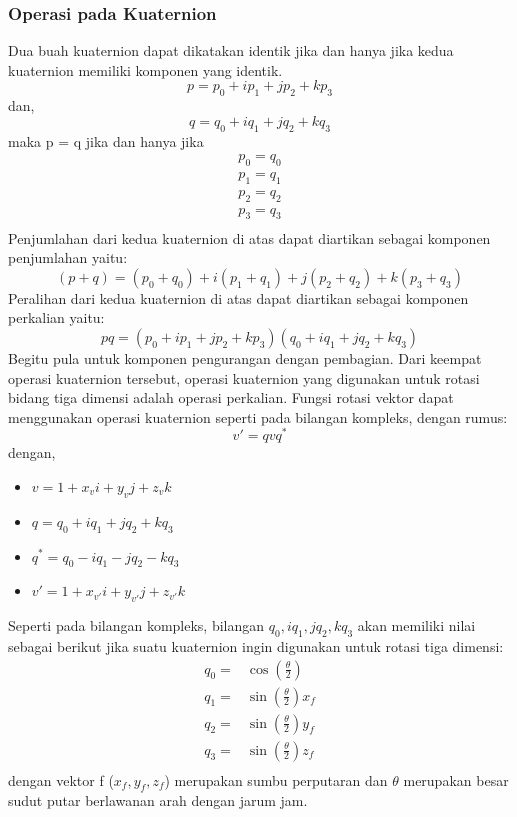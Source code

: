 \subsubsection{Operasi pada Kuaternion}
\label{sssec:operasi_pada_kuaternion}
Dua buah kuaternion dapat dikatakan identik jika dan hanya jika kedua kuaternion memiliki komponen yang identik.
\[
	p = p_0 +ip_1+jp_2+kp_3
\]
dan,
\[
	q = q_0 + i q_1 + j q_2 + k q_3
\]
maka p = q jika dan hanya jika
\begin{equation}
	\begin{split}
	p_0=q_0\\
	p_1=q_1\\
	p_2=q_2\\
	p_3=q_3\\
	\end{split}
\end{equation}
Penjumlahan dari kedua kuaternion di atas dapat diartikan sebagai komponen penjumlahan yaitu:
\[
	(p+q)=(p_0+q_0)+i(p_1+q_1)+j(p_2+q_2)+k(p_3+q_3)
\]
Peralihan dari kedua kuaternion di atas dapat diartikan sebagai komponen perkalian yaitu:
\[
	pq = (p_0 +ip_1+jp_2+kp_3)(q_0 + i q_1 + j q_2 + k q_3)
\]
Begitu pula untuk komponen pengurangan dengan pembagian. 
Dari keempat operasi kuaternion tersebut, operasi kuaternion yang digunakan untuk rotasi bidang tiga dimensi adalah operasi perkalian. Fungsi rotasi vektor dapat menggunakan operasi kuaternion seperti pada bilangan kompleks, dengan rumus:
\[
	v' = qvq^*
\]
dengan,
\begin{itemize}
	\item \(v = 1 + x_v i +y_v j + z_v k\)
	\item \(q = q_0 + i q_1 + j q_2 + k q_3	\)
	\item \(q^* =  q_0 - i q_1 - j q_2 - k q_3\)
	\item \(v' = 1 + x_{v'} i +y_{v'} j + z_{v'} k\)
\end{itemize}
Seperti pada bilangan kompleks, bilangan $q_0 ,i q_1,j q_2,k q_3$ akan memiliki nilai sebagai berikut jika suatu kuaternion ingin digunakan untuk rotasi tiga dimensi:
\begin{equation}
	\begin{split}
	q_0=& \cos (\frac{\theta}{2})\\
	q_1=& \sin (\frac{\theta}{2}) x_f\\
	q_2=& \sin (\frac{\theta}{2}) y_f\\
	q_3=& \sin (\frac{\theta}{2}) z_f\\
	\end{split}
\end{equation}
dengan vektor f ($x_f,y_f,z_f$) merupakan sumbu perputaran dan $\theta$ merupakan besar sudut putar berlawanan arah dengan jarum jam.

